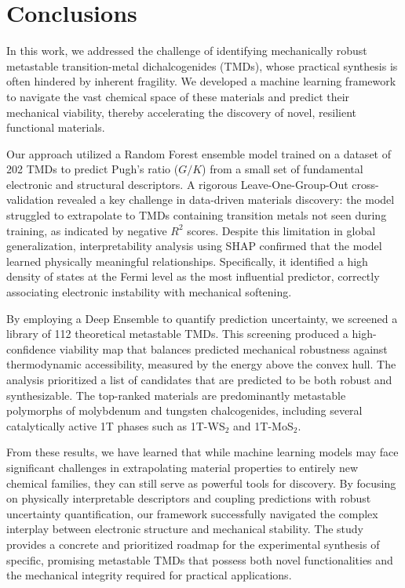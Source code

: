 \documentclass[]{article}
\begin{document}
\section{Conclusions}
\label{sec:conclusions}
In this work, we addressed the challenge of identifying mechanically robust metastable transition-metal dichalcogenides (TMDs), whose practical synthesis is often hindered by inherent fragility. We developed a machine learning framework to navigate the vast chemical space of these materials and predict their mechanical viability, thereby accelerating the discovery of novel, resilient functional materials.

Our approach utilized a Random Forest ensemble model trained on a dataset of 202 TMDs to predict Pugh's ratio ($G/K$) from a small set of fundamental electronic and structural descriptors. A rigorous Leave-One-Group-Out cross-validation revealed a key challenge in data-driven materials discovery: the model struggled to extrapolate to TMDs containing transition metals not seen during training, as indicated by negative $R^2$ scores. Despite this limitation in global generalization, interpretability analysis using SHAP confirmed that the model learned physically meaningful relationships. Specifically, it identified a high density of states at the Fermi level as the most influential predictor, correctly associating electronic instability with mechanical softening.

By employing a Deep Ensemble to quantify prediction uncertainty, we screened a library of 112 theoretical metastable TMDs. This screening produced a high-confidence viability map that balances predicted mechanical robustness against thermodynamic accessibility, measured by the energy above the convex hull. The analysis prioritized a list of candidates that are predicted to be both robust and synthesizable. The top-ranked materials are predominantly metastable polymorphs of molybdenum and tungsten chalcogenides, including several catalytically active 1T phases such as 1T-WS$_2$ and 1T-MoS$_2$.

From these results, we have learned that while machine learning models may face significant challenges in extrapolating material properties to entirely new chemical families, they can still serve as powerful tools for discovery. By focusing on physically interpretable descriptors and coupling predictions with robust uncertainty quantification, our framework successfully navigated the complex interplay between electronic structure and mechanical stability. The study provides a concrete and prioritized roadmap for the experimental synthesis of specific, promising metastable TMDs that possess both novel functionalities and the mechanical integrity required for practical applications.


{}

\end{document}
